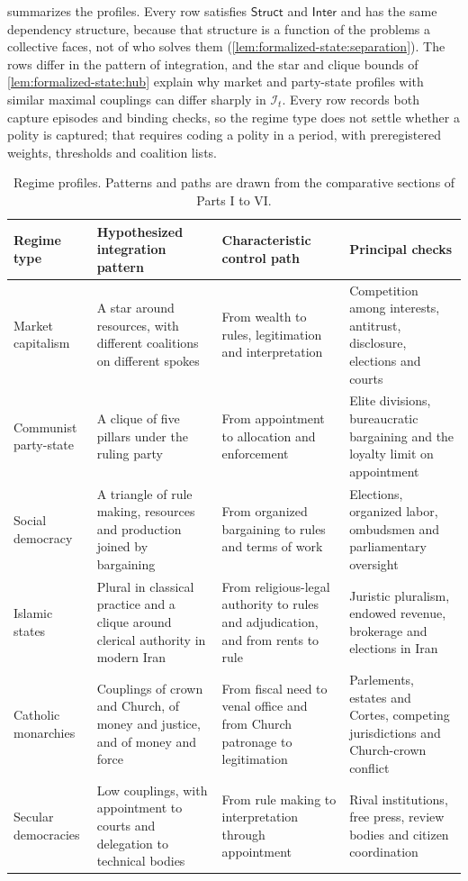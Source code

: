 \documentclass[11pt,letterpaper]{article}
\theoremstyle{definition}
\theoremstyle{remark}
\newcommand{\Integ}{\mathcal{I}}
\newcommand{\Struct}{\mathsf{Struct}}
\newcommand{\Inter}{\mathsf{Inter}}
\begin{document}
 summarizes the profiles. Every row satisfies $\Struct$ and $\Inter$ and has the same dependency structure, because that structure is a function of the problems a collective faces, not of who solves them (\cref{lem:formalized-state:separation}). The rows differ in the pattern of integration, and the star and clique bounds of \cref{lem:formalized-state:hub} explain why market and party-state profiles with similar maximal couplings can differ sharply in $\Integ_t$. Every row records both capture episodes and binding checks, so the regime type does not settle whether a polity is captured; that requires coding a polity in a period, with preregistered weights, thresholds and coalition lists.

\begin{table}[!htbp]
\centering
\small
\caption{Regime profiles. Patterns and paths are drawn from the comparative sections of Parts I to VI.}
\label{tab:regimes}
\begin{tabularx}{\textwidth}{@{}L{2.2cm}YYY@{}}
\toprule
Regime type & Hypothesized integration pattern & Characteristic control path & Principal checks \\
\midrule
Market capitalism & A star around resources, with different coalitions on different spokes & From wealth to rules, legitimation and interpretation & Competition among interests, antitrust, disclosure, elections and courts \\
Communist party-state & A clique of five pillars under the ruling party & From appointment to allocation and enforcement & Elite divisions, bureaucratic bargaining and the loyalty limit on appointment \\
Social democracy & A triangle of rule making, resources and production joined by bargaining & From organized bargaining to rules and terms of work & Elections, organized labor, ombudsmen and parliamentary oversight \\
Islamic states & Plural in classical practice and a clique around clerical authority in modern Iran & From religious-legal authority to rules and adjudication, and from rents to rule & Juristic pluralism, endowed revenue, brokerage and elections in Iran \\
Catholic monarchies & Couplings of crown and Church, of money and justice, and of money and force & From fiscal need to venal office and from Church patronage to legitimation & Parlements, estates and Cortes, competing jurisdictions and Church-crown conflict \\
Secular democracies & Low couplings, with appointment to courts and delegation to technical bodies & From rule making to interpretation through appointment & Rival institutions, free press, review bodies and citizen coordination \\
\bottomrule
\end{tabularx}
\end{table}
\end{document}
